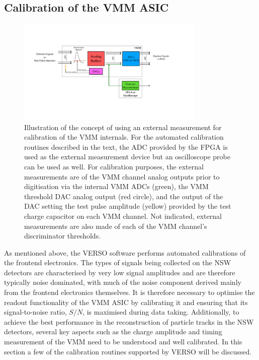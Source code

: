 \subsection{Calibration of the VMM ASIC}
\label{sec:calib_alg}

\begin{figure}[!htb]
    \begin{center}
        \includegraphics[width=0.8\textwidth]{figures/nsw/calibration/xadc_diagramPDF}
        \caption{
            Illustration of the concept of using an external measurement for calibration
            of the VMM internals.
            For the automated calibration routines described in the text, the ADC provided
            by the FPGA is used as the external measurement device but an oscilloscope probe can be used
            as well.
            For calibration purposes, the external measurements are of the VMM channel analog outputs prior
            to digitisation via the internal VMM ADCs
            (green), the VMM threshold DAC analog output (red circle), and the
            output of the DAC setting the test pulse amplitude (yellow) provided by the test charge capacitor
            on each VMM channel.
            Not indicated, external measurements are also made of each of the VMM channel's discriminator thresholds.
        }
        \label{fig:xadc_diagram}
    \end{center}
\end{figure}

As mentioned above, the VERSO software performs automated calibrations of
the frontend electronics.
The types of signals being collected on the NSW detectors are characterised by
very low signal amplitudes and are therefore typically noise dominated, with
much of the noise component derived mainly from the frontend electronics themselves.
It is therefore necessary to optimise the readout functionality of
the VMM ASIC by calibrating it and ensuring that its signal-to-noise
ratio, $S/N$, is maximised during data taking.
Additionally, to achieve the best performance in the reconstruction of particle
tracks in the NSW detectors, several key aspects such as the charge amplitude
and timing measurement of the VMM need to be understood and well calibrated.
In this section a few of the calibration routines supported by VERSO will be discussed.

